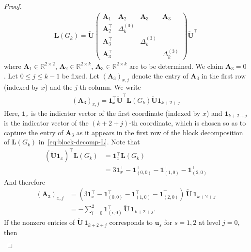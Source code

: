 \documentclass[10pt,a4paper]{amsart}
\begin{document}
\begin{proof}
\begin{align}
            \mathbf{L}(G_k) = \widetilde{\mathbf{U}} \begin{pmatrix} 
            \mathbf{A}_1 & \mathbf{A}_2 & \mathbf{A}_3 & \mathbf{A}_3\\
            \mathbf{A}_2^\top &\Delta_k^{(0)} & & \\
            \mathbf{A}_3^\top && \Delta_k^{(3)} & \\
            \mathbf{A}_3^\top && & \Delta_k^{(3)}
        \end{pmatrix} \widetilde{\mathbf{U}}^\top
        \end{align}
    where $\mathbf{A}_1\in\mathbb{R}^{2\times 2}$, $\mathbf{A}_2\in\mathbb{R}^{2\times k}$, $\mathbf{A}_3\in\mathbb{R}^{2\times k}$ are to be determined. We claim $\mathbf{A}_3=0$. Let $0\leq j \leq k-1$ be fixed. Let $(\mathbf{A}_3)_{x, j}$ denote the entry of $\mathbf{A}_3$ in the first row (indexed by $x$) and the $j$-th column. We write
        \begin{align*}
            (\mathbf{A}_3)_{x, j} = \mathbf{1}_x^\top \widetilde{\mathbf{U}}^\top \mathbf{L}(G_k)\widetilde{\mathbf{U}} \mathbf{1}_{k+2+j}
        \end{align*}
    Here, $\mathbf{1}_x$ is the indicator vector of the first coordinate (indexed by $x$) and $\mathbf{1}_{k+2+j}$ is the indicator vector of the $(k+2+j)$-th coordinate, which is chosen so as to capture the entry of $\mathbf{A}_3$ as it appears in the first row of the block decomposition of $\mathbf{L}(G_k)$ in~\cref{eq:block-decomp-L}. Note that
        \begin{align*}
            (\widetilde{\mathbf{U}}\mathbf{1}_x)^\top \mathbf{L}(G_k) &= \mathbf{1}_x^\top \mathbf{L}(G_k)\\
            &= 3\mathbf{1}_x^\top - \mathbf{1}_{(0, 0)}^\top - \mathbf{1}_{(1, 0)}^\top - \mathbf{1}_{(2, 0)}^\top
        \end{align*}
    And therefore
        \begin{align*}
            (\mathbf{A}_3)_{x,j}
            &=(3\mathbf{1}_x^\top - \mathbf{1}_{(0,0)}^\top - \mathbf{1}_{(1,0)}^\top - \mathbf{1}_{(2,0)}^\top)\,\widetilde{\mathbf{U}}\,\mathbf{1}_{k+2+j}\\
            &=-\sum_{i=0}^2 \mathbf{1}_{(i,0)}^\top\,\widetilde{\mathbf{U}}\,\mathbf{1}_{k+2+j}.
        \end{align*}
    If the nonzero entries of $\widetilde{\mathbf{U}}\,\mathbf{1}_{k+2+j}$ corresponds to $\mathbf{u}_s$ for $s=1,2$ at level $j=0$, then
        \begin{align*}

\end{align*}
\end{proof}
\end{document}
